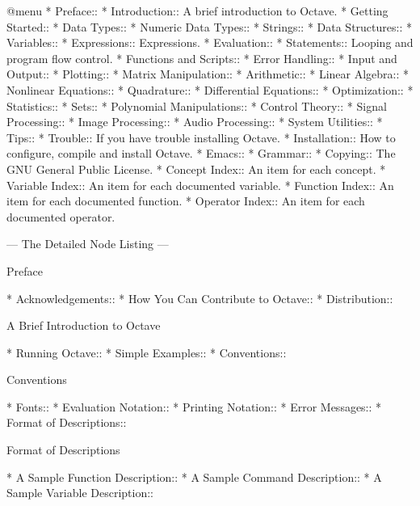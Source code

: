 @menu
* Preface::                     
* Introduction::                A brief introduction to Octave.
* Getting Started::             
* Data Types::                  
* Numeric Data Types::          
* Strings::                     
* Data Structures::             
* Variables::                   
* Expressions::                 Expressions.
* Evaluation::                  
* Statements::                  Looping and program flow control.
* Functions and Scripts::       
* Error Handling::              
* Input and Output::            
* Plotting::                    
* Matrix Manipulation::         
* Arithmetic::                  
* Linear Algebra::              
* Nonlinear Equations::         
* Quadrature::                  
* Differential Equations::      
* Optimization::                
* Statistics::                  
* Sets::                        
* Polynomial Manipulations::    
* Control Theory::              
* Signal Processing::           
* Image Processing::            
* Audio Processing::            
* System Utilities::            
* Tips::                        
* Trouble::                     If you have trouble installing Octave.
* Installation::                How to configure, compile and install Octave.
* Emacs::                       
* Grammar::                     
* Copying::                     The GNU General Public License.
* Concept Index::               An item for each concept.
* Variable Index::              An item for each documented variable.
* Function Index::              An item for each documented function.
* Operator Index::              An item for each documented operator.


 --- The Detailed Node Listing ---

Preface

* Acknowledgements::            
* How You Can Contribute to Octave::  
* Distribution::                

A Brief Introduction to Octave

* Running Octave::              
* Simple Examples::             
* Conventions::                 

Conventions

* Fonts::                       
* Evaluation Notation::         
* Printing Notation::           
* Error Messages::              
* Format of Descriptions::      

Format of Descriptions

* A Sample Function Description::  
* A Sample Command Description::  
* A Sample Variable Description::  

